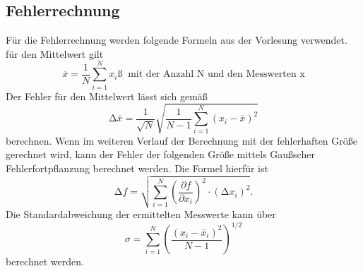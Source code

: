 \subsection{Fehlerrechnung}
\label{sec:Fehlerrechnung}
Für die Fehlerrechnung werden folgende Formeln aus der Vorlesung verwendet.
für den Mittelwert gilt
\begin{equation}
    \overline{x}=\frac{1}{N}\sum_{i=1}^N x_i ß\; \;\text{mit der Anzahl N und den Messwerten x} 
    \label{eqn:Mittelwert}
\end{equation}
Der Fehler für den Mittelwert lässt sich gemäß
\begin{equation}
    \increment \overline{x}=\frac{1}{\sqrt{N}}\sqrt{\frac{1}{N-1}\sum_{i=1}^N(x_i-\overline{x})^2}
    \label{eqn:FehlerMittelwert}
\end{equation}
berechnen.
Wenn im weiteren Verlauf der Berechnung mit der fehlerhaften Größe gerechnet wird, kann der Fehler der folgenden Größe
mittels Gaußscher Fehlerfortpflanzung berechnet werden. Die Formel hierfür ist
\begin{equation}
    \increment f= \sqrt{\sum_{i=1}^N\left(\frac{\partial f}{\partial x_i}\right)^2\cdot(\increment x_i)^2}.
    \label{eqn:GaussMittelwert}
\end{equation}
Die Standardabweichung der ermittelten Messwerte kann über 
\begin{equation}
    \sigma=\sum^{N}_{i=1}\left(\frac{(x_i-\bar{x}_i)^2}{N-1}\right)^{1/2}
    \label{eqn:Standardabweichung}
\end{equation}
berechnet werden.